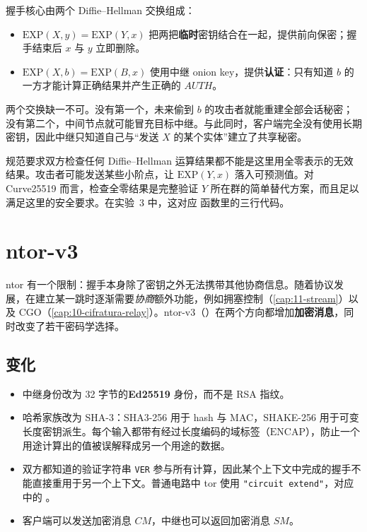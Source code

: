 握手核心由两个 Diffie--Hellman 交换组成：
\begin{itemize}
  \item $\mathrm{EXP}(X,y)=\mathrm{EXP}(Y,x)$ 把两把\textbf{临时}密钥结合在一起，提供前向保密；握手结束后 $x$ 与 $y$ 立即删除。
  \item $\mathrm{EXP}(X,b)=\mathrm{EXP}(B,x)$ 使用中继 onion key，提供\textbf{认证}：只有知道 $b$ 的一方才能计算正确结果并产生正确的 $\mathit{AUTH}$。
\end{itemize}

两个交换缺一不可。没有第一个，未来偷到 $b$ 的攻击者就能重建全部会话秘密；没有第二个，中间节点就可能冒充目标中继。与此同时，客户端完全没有使用长期密钥，因此中继只知道自己与\enquote{发送 $X$ 的某个实体}建立了共享秘密。

\begin{approfondimento}[检查全零共享秘密]
规范要求双方检查任何 Diffie--Hellman 运算结果都不能是这里用全零表示的无效结果。攻击者可能发送某些小阶点，让 $\mathrm{EXP}(Y,x)$ 落入可预测值。对 Curve25519 而言，检查全零结果是完整验证 $Y$ 所在群的简单替代方案，而且足以满足这里的安全要求。在实验~3 中，这对应  函数里的三行代码。
\end{approfondimento}

\section{ntor-v3}\label{sec:ntor3}

ntor 有一个限制：握手本身除了密钥之外无法携带其他协商信息。随着协议发展，在建立某一跳时逐渐需要\emph{协商}额外功能，例如拥塞控制（\cref{cap:11-stream}）以及 CGO（\cref{cap:10-cifratura-relay}）。ntor-v3（）在两个方向都增加\textbf{加密消息}，同时改变了若干密码学选择。

\subsection{变化}

\begin{itemize}
  \item 中继身份改为 32 字节的\textbf{Ed25519} 身份，而不是 RSA 指纹。
  \item 哈希家族改为 SHA-3：SHA3-256 用于 hash 与 MAC，SHAKE-256 用于可变长度密钥派生。每个输入都带有经过长度编码的域标签（$\mathrm{ENCAP}$），防止一个用途计算出的值被误解释成另一个用途的数据。
  \item 双方都知道的验证字符串 \texttt{VER} 参与所有计算，因此某个上下文中完成的握手不能直接重用于另一个上下文。普通电路中 tor 使用 \texttt{"circuit extend"}，对应  中的 。
  \item 客户端可以发送加密消息 $CM$，中继也可以返回加密消息 $SM$。
\end{itemize}

